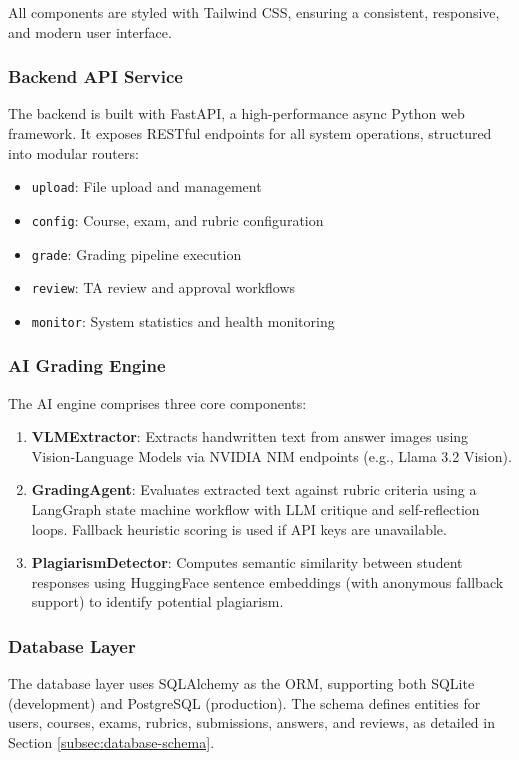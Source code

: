 \documentclass[11pt,a4paper]{article}
\begin{document}
All components are styled with Tailwind CSS, ensuring a consistent, responsive, and modern user interface.

\subsubsection{Backend API Service}
The backend is built with FastAPI, a high-performance async Python web framework. It exposes RESTful endpoints for all system operations, structured into modular routers:

\begin{itemize}[leftmargin=2em]
    \item \texttt{upload}: File upload and management
    \item \texttt{config}: Course, exam, and rubric configuration
    \item \texttt{grade}: Grading pipeline execution
    \item \texttt{review}: TA review and approval workflows
    \item \texttt{monitor}: System statistics and health monitoring
\end{itemize}

\subsubsection{AI Grading Engine}
The AI engine comprises three core components:

\begin{enumerate}[leftmargin=2em]
    \item \textbf{VLMExtractor}: Extracts handwritten text from answer images using Vision-Language Models via NVIDIA NIM endpoints (e.g., Llama 3.2 Vision).
    \item \textbf{GradingAgent}: Evaluates extracted text against rubric criteria using a LangGraph state machine workflow with LLM critique and self-reflection loops. Fallback heuristic scoring is used if API keys are unavailable.
    \item \textbf{PlagiarismDetector}: Computes semantic similarity between student responses using HuggingFace sentence embeddings (with anonymous fallback support) to identify potential plagiarism.
\end{enumerate}

\subsubsection{Database Layer}
The database layer uses SQLAlchemy as the ORM, supporting both SQLite (development) and PostgreSQL (production). The schema defines entities for users, courses, exams, rubrics, submissions, answers, and reviews, as detailed in Section \ref{subsec:database-schema}.
\end{document}
